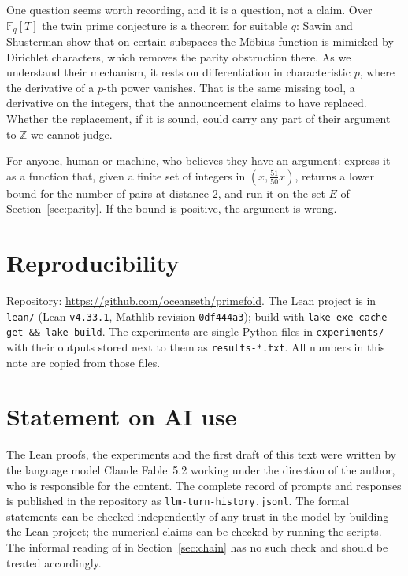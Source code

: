 \documentclass[11pt]{article}
\theoremstyle{definition}
\theoremstyle{remark}
\newcommand{\lean}[1]{\texttt{#1}}
\begin{document}
One question seems worth recording, and it is a question, not a claim. Over
$\mathbb{F}_q[T]$ the twin prime conjecture is a theorem for suitable $q$: Sawin
and Shusterman \cite{sawinshusterman} show that on certain subspaces the
M\"obius function is mimicked by Dirichlet characters, which removes the parity
obstruction there. As we understand their mechanism, it rests on
differentiation in characteristic $p$, where the derivative of a $p$-th power
vanishes. That is the same missing tool, a derivative on the integers, that the
announcement claims to have replaced. Whether the replacement, if it is sound,
could carry any part of their argument to $\mathbb{Z}$ we cannot judge.

For anyone, human or machine, who believes they have an argument: express it as
a function that, given a finite set of integers in $(x,\tfrac{51}{50}x)$,
returns a lower bound for the number of pairs at distance $2$, and run it on the
set $E$ of Section~\ref{sec:parity}. If the bound is positive, the argument is
wrong.

\section*{Reproducibility}

Repository: \url{https://github.com/oceanseth/primefold}. The Lean project is in
\lean{lean/} (Lean \lean{v4.33.1}, Mathlib revision \lean{0df444a3}); build with
\lean{lake exe cache get \&\& lake build}. The experiments are single Python
files in \lean{experiments/} with their outputs stored next to them as
\lean{results-*.txt}. All numbers in this note are copied from those files.

\section*{Statement on AI use}

The Lean proofs, the experiments and the first draft of this text were written
by the language model Claude Fable~5.2 working under the direction of the
author, who is responsible for the content. The complete record of prompts and
responses is published in the repository as \lean{llm-turn-history.jsonl}. The
formal statements can be checked independently of any trust in the model by
building the Lean project; the numerical claims can be checked by running the
scripts. The informal reading of \cite{lee} in Section~\ref{sec:chain} has no
such check and should be treated accordingly.
\end{document}
